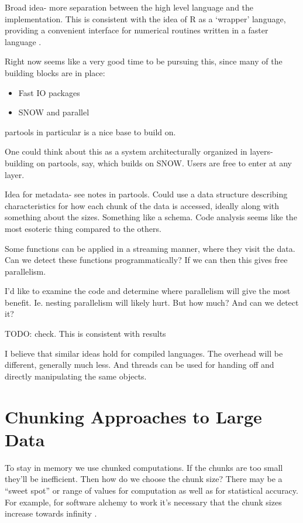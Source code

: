 \documentclass[12pt]{article}
\begin{document}
Broad idea- more separation between the high level language
and the implementation. This is consistent with the idea of R as a `wrapper'
language, providing a convenient interface for numerical routines written
in a faster language \cite{chambers2016extending}.

Right now seems like a very good time to be pursuing this, since many of the
building blocks are in place:
\begin{itemize}
    \item Fast IO packages
    \item SNOW and parallel
\end{itemize}

partools in particular is a nice base to build on.

One could think about this as a system architecturally organized in layers- building on
partools, say, which builds on SNOW. Users are free to enter at any layer.

Idea for metadata- see notes in partools. Could use a data structure
describing characteristics for how each chunk of the data is accessed,
ideally along with something about the sizes. Something like a schema.
Code analysis seems like the most esoteric thing compared to the others.

Some functions can be applied in a streaming manner, where they visit the
data. Can we detect these functions programmatically? If we can then this
gives free parallelism.

I'd like to examine the code and determine where parallelism will give the
most benefit. Ie. nesting parallelism will likely hurt. But how much? And
can we detect it?

TODO: check. This is consistent with results \cite{chambers2016extending}


I believe that similar ideas hold for compiled languages. The overhead will
be different, generally much less. And threads can be used for handing off
and directly manipulating the same objects.

\section{Chunking Approaches to Large Data}

To stay in memory we use chunked computations. If the chunks are too small
they'll be inefficient. Then how do we choose the chunk size?  There may be
a ``sweet spot'' or range of values for computation as well as for
statistical accuracy. For example, for software alchemy to work it's
necessary that the chunk sizes increase towards infinity
\cite{matloff2014software}.
\end{document}
